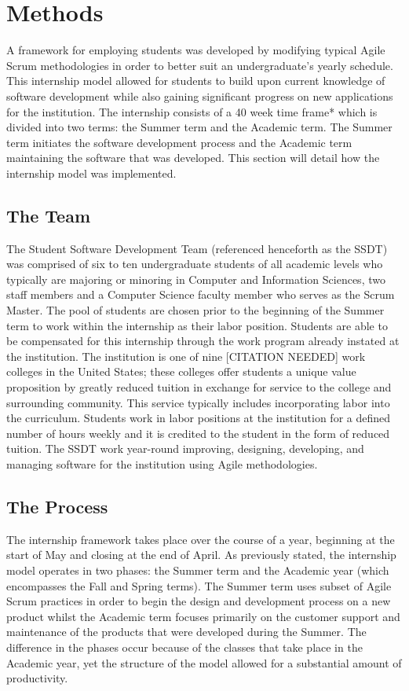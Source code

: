 \section{Methods}
A framework for employing students was developed by modifying typical Agile Scrum methodologies in order to better suit an undergraduate's yearly schedule. This internship model allowed for students to build upon current knowledge of software development while also gaining  significant progress on new applications for the institution. The internship consists of a 40 week time frame* which is divided into two terms: the Summer term and the Academic term. The Summer term initiates the software development process and the Academic term maintaining the software that was developed. This section will detail how the internship model was implemented.

\subsection{The Team}
The Student Software Development Team (referenced henceforth as the SSDT) was comprised of six to ten undergraduate students of all academic levels who typically are majoring or minoring in Computer and Information Sciences, two staff members and a Computer Science faculty member who serves as the Scrum Master. The pool of students are chosen prior to the beginning of the Summer term to work within the  internship as their labor position. Students are able to be compensated for this internship through the work program already instated at the institution. The institution is one of nine [CITATION NEEDED] work colleges in the United States; these colleges offer students a unique value proposition by greatly reduced tuition in exchange for service to the college and surrounding community. This service typically includes incorporating labor into the curriculum. Students work in labor positions at the institution for a defined number of hours weekly and it is credited to the student in the form of reduced tuition. The SSDT work year-round improving, designing, developing, and managing software for the institution using Agile methodologies.

\subsection{The Process}
The internship framework takes place over the course of a year, beginning at the start of May and closing at the end of April.  As previously stated, the internship model operates in two phases: the Summer term and the Academic year (which encompasses the Fall and Spring terms). The Summer term uses subset of Agile Scrum practices in order to begin the design and development process on a new product whilst the Academic term focuses primarily on the customer support and maintenance of the products that were developed during the Summer.  The difference in the phases occur because of the classes that take place in the Academic year, yet the structure of the model allowed for a substantial amount of productivity.

